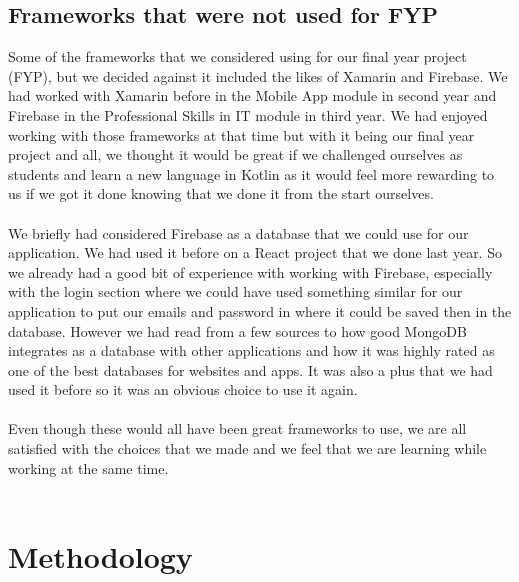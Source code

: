 \section{Frameworks that were not used for FYP}
Some of the frameworks that we considered using for our final year project (FYP), but we decided against it included the likes of Xamarin and Firebase. We had worked with Xamarin before in the Mobile App module in second year and Firebase in the Professional Skills in IT module in third year. We had enjoyed working with those frameworks at that time but with it being our final year project and all, we thought it would be great if we challenged ourselves as students and learn a new language in Kotlin as it would feel more rewarding to us if we got it done knowing that we done it from the start ourselves.
\\
\\
We briefly had considered Firebase as a database that we could use for our application. We had used it before on a React project that we done last year. So we already had a good bit of experience with working with Firebase, especially with the login section where we could have used something similar for our application to put our emails and password in where it could be saved then in the database. However we had read from a few sources to how good MongoDB integrates as a database with other applications and how it was highly rated as one of the best databases for websites and apps. It was also a plus that we had used it before so it was an obvious choice to use it again.
\\
\\
Even though these would all have been great frameworks to use, we are all satisfied with the choices that we made and we feel that we are learning while working at the same time.
\\
\\

\chapter{Methodology}

